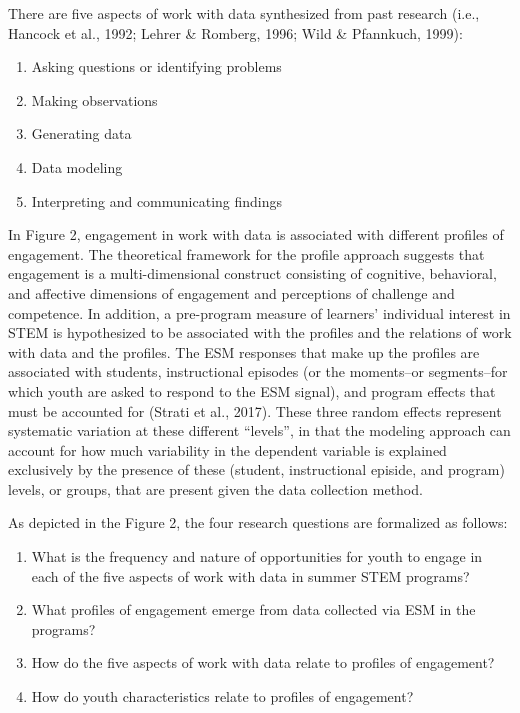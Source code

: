 \documentclass[]{book}
\providecommand{\tightlist}{%
  \setlength{\itemsep}{0pt}\setlength{\parskip}{0pt}}
\theoremstyle{definition}
\theoremstyle{definition}
\theoremstyle{definition}
\theoremstyle{remark}
\begin{document}
There are five aspects of work with data synthesized from past research
(i.e., Hancock et al., 1992; Lehrer \& Romberg, 1996; Wild \& Pfannkuch,
1999):

\begin{enumerate}
\def\labelenumi{\arabic{enumi}.}
\tightlist
\item
  Asking questions or identifying problems
\item
  Making observations
\item
  Generating data
\item
  Data modeling
\item
  Interpreting and communicating findings
\end{enumerate}

In Figure 2, engagement in work with data is associated with different
profiles of engagement. The theoretical framework for the profile
approach suggests that engagement is a multi-dimensional construct
consisting of cognitive, behavioral, and affective dimensions of
engagement and perceptions of challenge and competence. In addition, a
pre-program measure of learners' individual interest in STEM is
hypothesized to be associated with the profiles and the relations of
work with data and the profiles. The ESM responses that make up the
profiles are associated with students, instructional episodes (or the
moments--or segments--for which youth are asked to respond to the ESM
signal), and program effects that must be accounted for (Strati et al.,
2017). These three random effects represent systematic variation at
these different ``levels'', in that the modeling approach can account
for how much variability in the dependent variable is explained
exclusively by the presence of these (student, instructional episide,
and program) levels, or groups, that are present given the data
collection method.

As depicted in the Figure 2, the four research questions are formalized
as follows:

\begin{enumerate}
\def\labelenumi{\arabic{enumi}.}
\tightlist
\item
  What is the frequency and nature of opportunities for youth to engage
  in each of the five aspects of work with data in summer STEM programs?
\item
  What profiles of engagement emerge from data collected via ESM in the
  programs?
\item
  How do the five aspects of work with data relate to profiles of
  engagement?
\item
  How do youth characteristics relate to profiles of engagement?
\end{enumerate}
\end{document}
